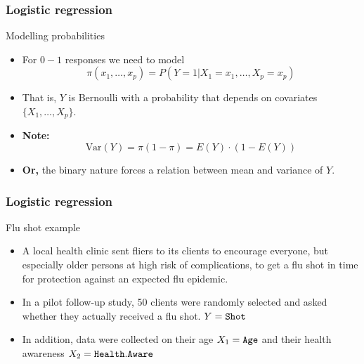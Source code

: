 \documentclass[handout]{beamer}
\begin{document}

   \begin{frame} \frametitle{Logistic regression}

   \begin{block}
       {Modelling probabilities}
       \begin{itemize}
       \item For $0-1$ responses we need to model
   $$
   \pi(x_1, \dots, x_p) = P(Y=1|X_1=x_1,\dots, X_p=x_p)
   $$

   \item That is, $Y$ is Bernoulli with a probability that
   depends on covariates $\{X_1, \dots, X_p\}$.

   \item {\bf Note:}
   $$
   \text{Var}(Y) = \pi ( 1 - \pi) = E(Y) \cdot ( 1-  E(Y))
   $$

   \item {\bf Or,} the binary nature forces a relation between
   mean and variance of $Y$.
       \end{itemize}
   \end{block}
   \end{frame}


   \begin{frame} \frametitle{Logistic regression}

   \begin{block}
       {Flu shot example}
       \begin{itemize}
       \item      A local health clinic sent fliers to its clients to encourage
        everyone, but especially older persons at high risk of
        complications, to get a flu shot in time for protection
        against an expected flu epidemic.


      \item      In a pilot follow-up study, 50 clients were randomly
        selected and asked whether they actually received a flu
        shot. $Y={\tt Shot}$


      \item      In addition, data were collected on their age $X_1={\tt Age}$ and their
        health awareness $X_2={\tt Health.Aware}$

       \end{itemize}

   \end{block}
   \end{frame}
\end{document}
